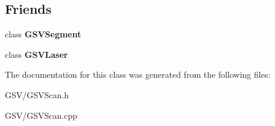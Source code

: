 \subsection*{Friends}
\begin{DoxyCompactItemize}
\item 
class {\bfseries G\+S\+V\+Segment}\hypertarget{class_g_s_v_scan_a24c71f4a2a67fb7c97d76dffafabda73}{}\label{class_g_s_v_scan_a24c71f4a2a67fb7c97d76dffafabda73}

\item 
class {\bfseries G\+S\+V\+Laser}\hypertarget{class_g_s_v_scan_adbf4d02bbb6b74ff3478440bfffce348}{}\label{class_g_s_v_scan_adbf4d02bbb6b74ff3478440bfffce348}

\end{DoxyCompactItemize}


The documentation for this class was generated from the following files\+:\begin{DoxyCompactItemize}
\item 
G\+S\+V/G\+S\+V\+Scan.\+h\item 
G\+S\+V/G\+S\+V\+Scan.\+cpp\end{DoxyCompactItemize}
